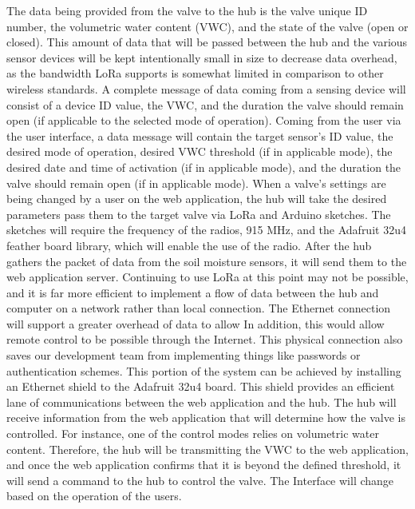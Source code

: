 \documentclass[onecolumn, draftclsnofoot,10pt, compsoc]{IEEEtran}
\newcounter{subsubsubsection}[subsubsection]
\begin{document}
	The data being provided from the valve to the hub is the valve unique ID number, the volumetric water content (VWC), and the state of the valve (open or closed).
	This amount of data that will be passed between the hub and the various sensor devices will be kept intentionally small in size to decrease data overhead, as the bandwidth LoRa supports is somewhat limited in comparison to other wireless standards.
	A complete message of data coming from a sensing device will consist of a device ID value, the VWC, and the duration the valve should remain open (if applicable to the selected mode of operation).
	Coming from the user via the user interface, a data message will contain the target sensor's ID value, the desired mode of operation, desired VWC threshold (if in applicable mode), the desired date and time of activation (if in applicable mode), and the duration the valve should remain open (if in applicable mode).
	When a valve's settings are being changed by a user on the web application, the hub will take the desired parameters pass them to the target valve via LoRa and Arduino sketches.
	The sketches will require the frequency of the radios, 915 MHz, and the Adafruit 32u4 feather board library, which will enable the use of the radio.
	After the hub gathers the packet of data from the soil moisture sensors, it will send them to the web application server. 
	Continuing to use LoRa at this point may not be possible, and it is far more efficient to implement a flow of data between the hub and computer on a network rather than local connection.
	The Ethernet connection will support a greater overhead of data to allow 
	In addition, this would allow remote control to be possible through the Internet.
	This physical connection also saves our development team from implementing things like passwords or authentication schemes. 
	This portion of the system can be achieved by installing an Ethernet shield to the Adafruit 32u4 board.
	This shield provides an efficient lane of communications between the web application and the hub.
	The hub will receive information from the web application that will determine how the valve is controlled. 
	For instance, one of the control modes relies on volumetric water content. 
	Therefore, the hub will be transmitting the VWC to the web application, and once the web application confirms that it is beyond the defined threshold, it will send a command to the hub to control the valve. 
	The Interface will change based on the operation of the users. 
\end{document}
